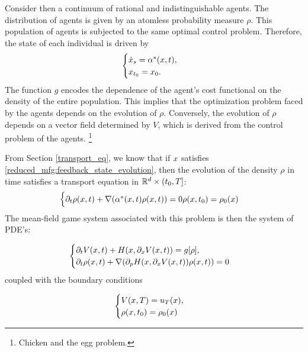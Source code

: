 \documentclass{article}
\begin{document}
Consider then a continuum of rational and indistinguishable agents.
The distribution of agents is given by an atomless probability measure $\rho$.
This population of agents is subjected to the same optimal control problem.
Therefore, the state of each individual is driven by
\begin{equation}\label{reduced_mfg:feedback_state_evolution}
\begin{cases}
        {\dot {x}}_s = \alpha^*(x,t),\\
        {x}_{t_0} = x_0.
\end{cases}
\end{equation}
The function $g$ encodes the dependence of the agent's cost functional on the density of the entire population.
This implies that the optimization problem faced by the agents depends on the evolution of $\rho$.
Conversely, the evolution of $\rho$ depends on a vector field determined by $V$, which is derived from the control problem of the agents.
\footnote{Chicken and the egg problem.}

From Section
\eqref{transport_eq},
we know that if $x$ satisfies
\eqref{reduced_mfg:feedback_state_evolution},
then the evolution of the density $\rho$ in time satisfies a transport equation in $\mathbb{R}^d \times (t_0, T]$:
\begin{equation}\label{reduced_mfg:density_transport_pde}
    \begin{cases}
        \partial_t \rho(x,t) + \nabla(\alpha^*(x,t) \rho(x,t)) = 0
        \rho(x,t_0) = \rho_0(x)
\end{cases}
\end{equation}
The mean-field game system associated with this problem is then the system of PDE's:

\begin{equation}\label{reduced_mfg:mfg_system}
    \begin{cases}
        \partial_t V (x,t) + H(x,\partial_x V(x,t)) = g[\rho], \\
        \partial_t \rho(x,t) + \nabla(\partial_p H(x, \partial_x V (x,t)) \rho(x,t)) = 0
\end{cases}
\end{equation}
coupled with the boundary conditions

\begin{equation}\label{reduced_mfg:mfg_boundary_conditions}
\begin{cases}
    V(x,T) = u_T(x), \\
    \rho(x,t_0) = \rho_0(x)
\end{cases}
\end{equation}
\end{document}

